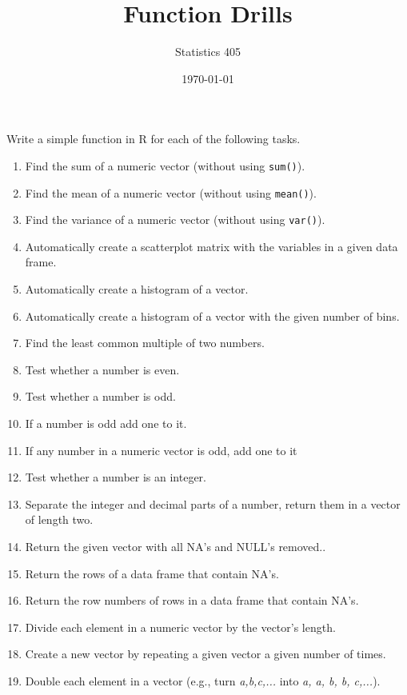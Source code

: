 \documentclass{article}
\begin{document}
\title{Function Drills}
\author{Statistics 405}
\date{\today}
\maketitle


\noindent Write a simple function in R for each of the following tasks. 

\begin{enumerate}
\item Find the sum of a numeric vector (without using \verb!sum()!).
\item Find the mean of a numeric vector (without using \verb!mean()!).
\item Find the variance of a numeric vector (without using \verb!var()!).
\item Automatically create a scatterplot matrix with the variables in a given data frame.
\item Automatically create a histogram of a vector.
\item Automatically create a histogram of a vector with the given number of bins.
\item Find the least common multiple of two numbers.
\item Test whether a number is even.
\item Test whether a number is odd.
\item If a number is odd add one to it.
\item If any number in a numeric vector is odd, add one to it
\item Test whether a number is an integer.
\item Separate the integer and decimal parts of a number, return them in a vector of length two.
\item Return the given vector with all NA's and NULL's removed..
\item Return the rows of a data frame that contain NA's.
\item Return the row numbers of rows in a data frame that contain NA's.
\item Divide each element in a numeric vector by the vector's length.
\item Create a new vector by repeating a given vector a given number of times.
\item Double each element in a vector (e.g., turn \emph{a,b,c,...} into \emph{a, a, b, b, c,...}).

\end{enumerate}
\end{document}
